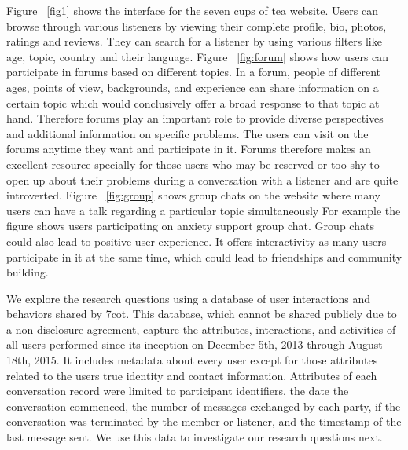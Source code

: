 \newpage
Figure ~\ref{fig1} shows the interface for the seven cups of tea website. Users can browse through various listeners by viewing their complete profile, bio, photos, ratings and reviews. They can search for a listener by using various filters like age, topic, country and their language. Figure ~\ref{fig:forum} shows how users can participate in forums based on different topics. In a forum, people of different ages, points of view, backgrounds, and experience can share information on a certain topic which would conclusively offer a broad response to that topic at hand. Therefore forums play an important role to provide diverse perspectives and additional information on specific problems. The users can visit on the forums anytime they want and participate in it. Forums therefore makes an excellent resource specially for those users who may be reserved or too shy to open up about their problems during a conversation with a listener and are quite introverted.  Figure ~\ref{fig:group} shows group chats on the website where many users can have a talk regarding a particular topic simultaneously For example the figure shows users participating on anxiety support group chat. Group chats could also lead to positive user experience. It offers interactivity as many users participate in it at the same time, which could lead to friendships and community building.

We explore the research questions using a database of user interactions and behaviors shared by 7cot. This database, which cannot be shared publicly due to a non-disclosure agreement, capture the attributes, interactions, and activities of all users performed since its inception on December 5th, 2013 through August 18th, 2015. It includes metadata about every user except for those attributes related to the users true identity and contact information. Attributes of each conversation record were limited to participant identifiers, the date the conversation commenced, the number of messages exchanged by each party, if the conversation was terminated by the member or listener, and the timestamp of the last message sent. We use this data to investigate our research questions next. 

